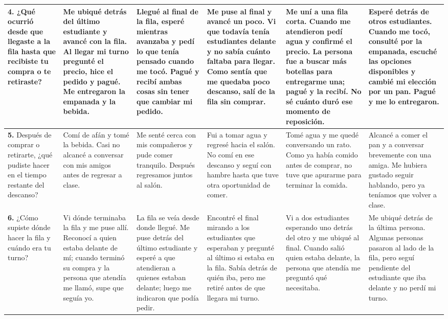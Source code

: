 \documentclass[12pt]{article}
\newcommand{\sol}[1]{{\color{solutionred}\small\strut #1\strut}}
\begin{document}
\begin{longtable}{|*{6}{L{\dimexpr(\arrayrulewidth)/6\relax}|}}
\textbf{4.} ¿Qué ocurrió desde que llegaste a la fila hasta que recibiste tu compra o te retiraste? & \sol{Me ubiqué detrás del último estudiante y avancé con la fila. Al llegar mi turno pregunté el precio, hice el pedido y pagué. Me entregaron la empanada y la bebida.} & \sol{Llegué al final de la fila, esperé mientras avanzaba y pedí lo que tenía pensado cuando me tocó. Pagué y recibí ambas cosas sin tener que cambiar mi pedido.} & \sol{Me puse al final y avancé un poco. Vi que todavía tenía estudiantes delante y no sabía cuánto faltaba para llegar. Como sentía que me quedaba poco descanso, salí de la fila sin comprar.} & \sol{Me uní a una fila corta. Cuando me atendieron pedí agua y confirmé el precio. La persona fue a buscar más botellas para entregarme una; pagué y la recibí. No sé cuánto duró ese momento de reposición.} & \sol{Esperé detrás de otros estudiantes. Cuando me tocó, consulté por la empanada, escuché las opciones disponibles y cambié mi elección por un pan. Pagué y me lo entregaron.} \\ \hline
\textbf{5.} Después de comprar o retirarte, ¿qué pudiste hacer en el tiempo restante del descanso? & \sol{Comí de afán y tomé la bebida. Casi no alcancé a conversar con mis amigos antes de regresar a clase.} & \sol{Me senté cerca con mis compañeros y pude comer tranquilo. Después regresamos juntos al salón.} & \sol{Fui a tomar agua y regresé hacia el salón. No comí en ese descanso y seguí con hambre hasta que tuve otra oportunidad de comer.} & \sol{Tomé agua y me quedé conversando un rato. Como ya había comido antes de comprar, no tuve que apurarme para terminar la comida.} & \sol{Alcancé a comer el pan y a conversar brevemente con una amiga. Me hubiera gustado seguir hablando, pero ya teníamos que volver a clase.} \\ \hline
\textbf{6.} ¿Cómo supiste dónde hacer la fila y cuándo era tu turno? & \sol{Vi dónde terminaba la fila y me puse allí. Reconocí a quien estaba delante de mí; cuando terminó su compra y la persona que atendía me llamó, supe que seguía yo.} & \sol{La fila se veía desde donde llegué. Me puse detrás del último estudiante y esperé a que atendieran a quienes estaban delante; luego me indicaron que podía pedir.} & \sol{Encontré el final mirando a los estudiantes que esperaban y pregunté al último si estaba en la fila. Sabía detrás de quién iba, pero me retiré antes de que llegara mi turno.} & \sol{Vi a dos estudiantes esperando uno detrás del otro y me ubiqué al final. Cuando salió quien estaba delante, la persona que atendía me preguntó qué necesitaba.} & \sol{Me ubiqué detrás de la última persona. Algunas personas pasaron al lado de la fila, pero seguí pendiente del estudiante que iba delante y no perdí mi turno.} \\ \hline

\end{longtable}
\end{document}
